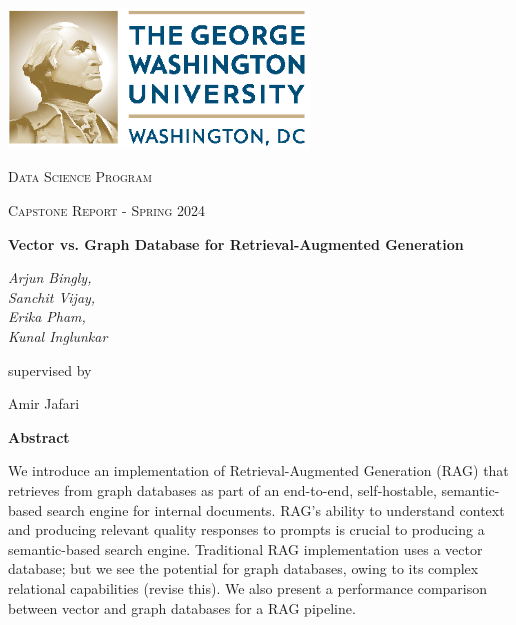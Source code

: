 \documentclass{scrartcl}
\renewenvironment{abstract}{
    \centering
    \textbf{Abstract}
    \vspace{0.5cm}
    \par\itshape
    \begin{minipage}{0.7\linewidth}}{\end{minipage}
    \noindent\ignorespaces
}
\begin{document}
\begin{titlepage}
	\centering
	\includegraphics[width=0.6\textwidth]{GW_logo.eps}\par
	\vspace{2cm}
	{\scshape\LARGE Data Science Program \par}
	\vspace{1cm}
	{\scshape\Large Capstone Report - Spring 2024\par}
	\vspace{1.5cm}
	{\huge\bfseries Vector vs. Graph Database for Retrieval-Augmented Generation\par}
	\vspace{2cm}
	{\Large\itshape Arjun Bingly,\\ Sanchit Vijay,\\ Erika Pham,\\Kunal Inglunkar}\par
	\vspace{1.5cm}
	supervised by\par
	Amir Jafari

	\vfill
	\begin{abstract}
	    We introduce an implementation of Retrieval-Augmented Generation (RAG) that retrieves from graph databases as part of an end-to-end, self-hostable, semantic-based search engine for internal documents. RAG’s ability to understand context and producing relevant quality responses to prompts is crucial to producing a semantic-based search engine. Traditional RAG implementation uses a vector database; but we see the potential for graph databases, owing to its complex relational capabilities (revise this). We also present a performance comparison between vector and graph databases for a RAG pipeline. 
	\end{abstract}
	\vfill
\end{titlepage}
\tableofcontents
\newpage
\end{document}
